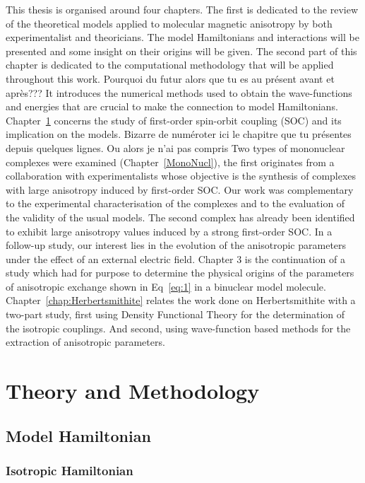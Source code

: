 \documentclass[12pt,a4paper]{report}
\numberwithin{equation}{section}
\begin{document}
This thesis is organised around four chapters. The first is dedicated to the review of the theoretical models applied to molecular magnetic anisotropy by both experimentalist and theoricians.
The model Hamiltonians and interactions will be presented and some insight on their origins will be given.
The second part of this chapter is dedicated to the computational methodology that will be applied throughout this work. Pourquoi du futur alors que tu es au présent avant et après???
It introduces the numerical methods used to obtain the wave-functions and energies that are crucial to make the connection to model Hamiltonians.
Chapter~\ref{TheoryMethod} concerns the study of first-order spin-orbit coupling (SOC) and its implication on the models. Bizarre de numéroter ici le chapitre que tu présentes depuis quelques lignes. Ou alors je n'ai pas compris
Two types of mononuclear complexes were examined (Chapter~\ref{MonoNucl}), the first originates from a collaboration with experimentalists whose objective is the synthesis of complexes with large anisotropy induced by first-order SOC.
Our work was complementary to the experimental characterisation of the complexes and to the evaluation of the validity of the usual models.
The second complex has already been identified to exhibit large anisotropy values induced by a strong first-order SOC.\cite{ruamps_giant_2013}
In a follow-up study, our interest lies in the evolution of the anisotropic parameters under the effect of an external electric field.
Chapter 3 is the continuation of a study which had for purpose to determine the physical origins of the parameters of anisotropic exchange shown in Eq~\ref{eq:1} in a binuclear model molecule.
Chapter~\ref{chap:Herbertsmithite} relates the work done on Herbertsmithite with a two-part study, first using Density Functional Theory for the determination of the isotropic couplings. 
And second, using wave-function based methods for the extraction of anisotropic parameters.



\chapter{Theory and Methodology}
\label{TheoryMethod}
\section{Model Hamiltonian}

\subsection{Isotropic Hamiltonian}
\end{document}
